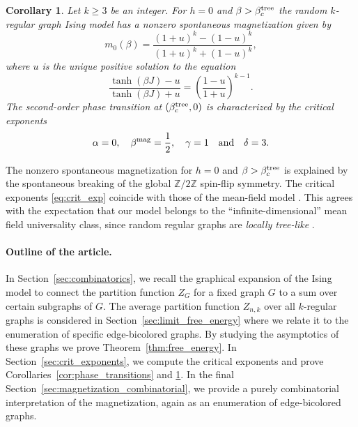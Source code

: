 \documentclass{article}
\numberwithin{theorem}{section}
\newtheorem{corollary}[theorem]{Corollary}
\theoremstyle{remark}
\begin{document}
\begin{corollary}
 \label{cor:critical_exponents}
    Let $k\geq 3$ be an integer. For $h=0$ and $\beta > \beta_c^{\rm tree}$ the random $k$-regular graph Ising model has a nonzero spontaneous magnetization given by
    \begin{equation}
    m_0(\beta) = \frac{(1+u)^k - (1-u)^k}{(1+u)^k + (1-u)^k},
  \end{equation}
  where $u$ is the unique positive solution to the equation
  \begin{equation}
    \frac{\tanh(\beta J) - u}{\tanh(\beta J) + u} = \left( \frac{1-u}{1+u} \right)^{k-1}.
  \end{equation}
  The second-order phase transition at $(\beta_c^{\rm tree}, 0)$ is characterized by the critical exponents
  \begin{equation}
    \label{eq:crit_exp}
    \alpha=0,\quad \beta^{\rm mag} = \frac{1}{2},\quad \gamma=1 \quad \text{and} \quad \delta = 3.
  \end{equation}
\end{corollary}

The nonzero spontaneous magnetization for $h=0$ and $\beta > \beta_c^{\rm tree}$ is explained by the spontaneous breaking of the global $\mathbb{Z}/2\mathbb{Z}$ spin-flip symmetry.
The critical exponents \eqref{eq:crit_exp} coincide with those of the mean-field model \cite[\S 3]{baxter1982exactly}. This agrees with the expectation that our model belongs to the ``infinite-dimensional'' mean field universality class, since random regular graphs are \emph{locally tree-like} \cite{Dembo_Montanari_Locally_Tree_Like}.\par

\paragraph{Outline of the article.} In Section~\ref{sec:combinatorics}, we recall the graphical expansion of the Ising model to connect the partition function $Z_G$ for a fixed graph $G$ to a sum over certain subgraphs of $G$. The average partition function $Z_{n,k}$ over all $k$-regular graphs is considered in Section~\ref{sec:limit_free_energy} where we relate it to the enumeration of specific edge-bicolored graphs. By studying the asymptotics of these graphs we prove Theorem~\ref{thm:free_energy}. In Section~\ref{sec:crit_exponents}, we compute the critical exponents and prove Corollaries~\ref{cor:phase_transitions} and \ref{cor:critical_exponents}. In the final Section~\ref{sec:magnetization_combinatorial}, we provide a purely combinatorial interpretation of the magnetization, again as an enumeration of edge-bicolored graphs.
\end{document}
